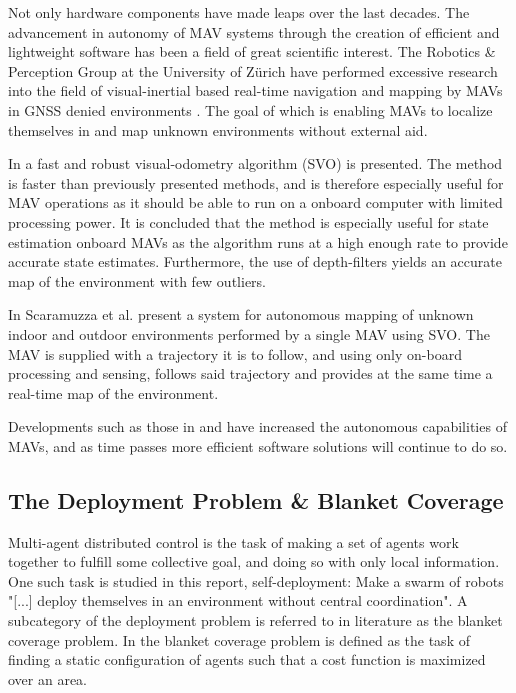 Not only hardware components have made leaps over the last decades. The advancement in autonomy of MAV systems through the creation of efficient and lightweight software has been a field of great scientific interest.
The Robotics \& Perception Group at the University of Z\"urich have performed excessive research into the field of visual-inertial based real-time navigation and mapping
by MAVs in GNSS denied environments \cite{svo2, svo1}. The goal of which is enabling MAVs to localize themselves in and map unknown environments without external aid.

In \cite{svo2} a fast and robust visual-odometry algorithm (SVO) is presented. The method is faster than previously presented methods, and is therefore especially useful 
for MAV operations as it should be able to run on a onboard computer with limited processing power. It is concluded that the method is especially useful for state estimation onboard MAVs as the algorithm runs
at a high enough rate to provide accurate state estimates. Furthermore, the use of depth-filters yields an accurate map of the environment with few outliers.

In \cite{svo1} Scaramuzza et al. present a system for autonomous mapping of unknown indoor and outdoor environments performed by a single MAV using SVO. The MAV is supplied with 
a trajectory it is to follow, and using only on-board processing and sensing, follows said trajectory and provides at the same time a real-time map of the environment.

Developments such as those in \cite{svo2} and \cite{svo1} have increased the autonomous capabilities of MAVs, and as time passes more efficient software solutions will continue to do so.

\subsection{The Deployment Problem \& Blanket Coverage}
Multi-agent distributed control is the task of making a set of agents work together to fulfill some collective goal, and doing so 
with only local information. One such task is studied in this report, self-deployment: Make a swarm of robots "[...] deploy 
themselves in an environment without central coordination"\cite{BAYINDIR2016292}. A subcategory of the deployment problem is referred to 
in literature as the blanket coverage problem. In \cite{BAYINDIR2016292} the blanket coverage problem is defined as the task of finding a static 
configuration of agents such that a cost function is maximized over an area.

